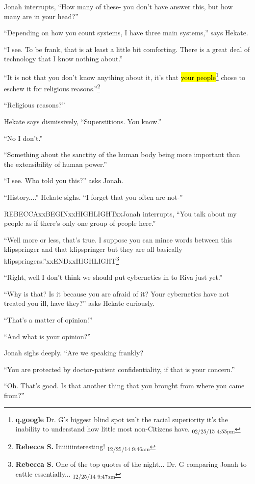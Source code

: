 Jonah interrupts, ``How many of these- you don't have answer this, but how many are in your head?''

``Depending on how you count systems, I have three main systems,'' says Hekate.

``I see.  To be frank, that is at least a little bit comforting.  There is a great deal of technology that I know nothing about.''

``It is not that you don't know anything about it, it's that \hl{your people}\footnote{\textbf{q.google }Dr. G's biggest blind spot isn't the racial superiority it's the inability to understand how little most non-Citizens have. \textsubscript{02/25/15 4:55pm}} chose to eschew it for religious reasons.''\footnote{\textbf{Rebecca S. }Iiiiiiiiinteresting! \textsubscript{12/25/14 9:46am}}

``Religious reasons?''

Hekate says dismissively, ``Superstitions.  You know.''

``No I don't.''

``Something about the sanctity of the human body being more important than the extensibility of human power.'' 

``I see.  Who told you this?'' asks Jonah.

``History....'' Hekate sighs.  ``I forget that you often are not-''

REBECCAxxBEGINxxHIGHLIGHTxxJonah interrupts, ``You talk about my people as if there's only one group of people here.''

``Well more or less, that's true.  I suppose you can mince words between this klipspringer and that klipspringer but they are all basically klipspringers.''xxENDxxHIGHLIGHT\footnote{\textbf{Rebecca S. }One of the top quotes of the night... Dr. G comparing Jonah to cattle essentially... \textsubscript{12/25/14 9:47am}}

``Right, well I don't think we should put cybernetics in to Riva just yet.''

``Why is that?  Is it because you are afraid of it?  Your cybernetics have not treated you ill, have they?'' asks Hekate curiously.

``That's a matter of opinion!''

``And what is your opinion?''

Jonah sighs deeply.  ``Are we speaking frankly?

``You are protected by doctor-patient confidentiality, if that is your concern.''

``Oh.  That's good.  Is that another thing that you brought from where you came from?''

